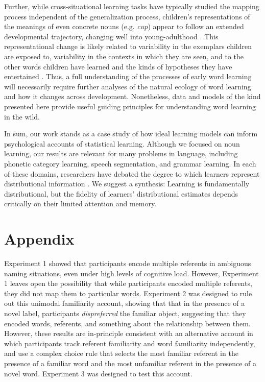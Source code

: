 \documentclass[authoryear,review]{elsarticle}
\begin{document}
Further, while cross-situational learning tasks have typically studied the mapping process independent of the generalization process, children's representations of the meanings of even concrete nouns (e.g. \emph{cup}) appear to follow an extended developmental trajectory, changing well into young-adulthood \citep{ameel2008}. This representational change is likely related to variability in the exemplars children are exposed to, variability in the contexts in which they are seen, and to the other words children have learned and the kinds of hypotheses they have entertained \citep{hidaka2010,Dautriche2014}. Thus, a full understanding of the processes of early word learning will necessarily require further analyses of the natural ecology of word learning and how it changes across development. Nonetheless, data and models of the kind presented here provide useful guiding principles for understanding word learning in the wild.

In sum, our work stands as a case study of how ideal learning models can inform psychological accounts of statistical learning. Although we focused on noun learning, our results are relevant for many problems in language, including phonetic category learning, speech segmentation, and grammar learning. In each of these domains, researchers have debated the degree to which learners represent distributional information \citep{Endress2005, Frank2010a, McMurray2013}. We suggest a synthesis: Learning is fundamentally distributional, but the fidelity of learners' distributional estimates depends critically on their limited attention and memory.

\section{Appendix}

\renewcommand{\thetable}{A\arabic{table}}
\setcounter{table}{0}
\renewcommand{\thefigure}{A\arabic{figure}}
\setcounter{figure}{0}

Experiment 1 showed that participants encode multiple referents in ambiguous naming situations, even under high levels of cognitive load. However, Experiment 1 leaves open the possibility that while participants encoded multiple referents, they did not map them to particular words. Experiment 2 was designed to rule out this unimodal familiarity account, showing that that in the presence of a novel label, participants \emph{dispreferred} the familiar object, suggesting that they encoded words, referents, and something about the relationship between them. However, these results are in-principle consistent with an alternative account in which participants track referent familiarity and word familiarity independently, and use a complex choice rule that selects the most familiar referent in the presence of a familiar word and the most unfamiliar referent in the presence of a novel word. Experiment 3 was designed to test this account.
\end{document}

